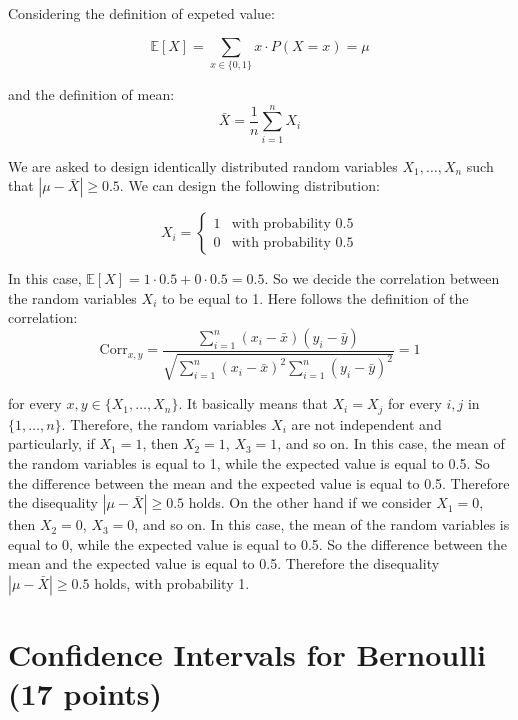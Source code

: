 \documentclass[a4paper,12pt]{article}
\begin{document}
Considering the definition of expeted value:

\begin{equation}
	\mathbb{E}[X] = \sum_{x \in \{0, 1\}} x \cdot P(X = x) = \mu
\end{equation}

and the definition of mean:
\begin{equation}
	\bar{X} = \frac{1}{n} \sum_{i=1}^{n} X_i
\end{equation}

We are asked to design identically distributed random variables $X_1, \dots,
	X_n$ such that $|\mu - \bar{X}| \geq 0.5$. We can design the following
distribution:

\begin{equation}
	X_i = \begin{cases}
		1 & \text{with probability } 0.5 \\
		0 & \text{with probability } 0.5
	\end{cases}
\end{equation}

In this case, $\mathbb{E}[X] = 1 \cdot 0.5 + 0 \cdot 0.5 = 0.5$. So we decide
the correlation between the random variables $X_i$ to be equal to 1. Here
follows the definition of the correlation:
\begin{equation}
	\text{Corr}_{x,y} = \frac{\sum_{i=1}^n (x_i - \bar{x})(y_i - \bar{y})}
	{\sqrt{\sum_{i=1}^n (x_i - \bar{x})^2 \sum_{i=1}^n (y_i - \bar{y})^2}} = 1
\end{equation}

for every $x, y \in \{X_1, \dots, X_n\}$.
It basically means that $X_i = X_j$ for every $i, j$ in $\{1, \dots, n\}$.
Therefore, the random variables $X_i$ are not independent and particularly, if
$X_1 = 1$, then $X_2 = 1$, $X_3 = 1$, and so on. In this case, the mean of the
random variables is equal to 1, while the expected value is equal to 0.5. So
the difference between the mean and the expected value is equal to 0.5.
Therefore the disequality $|\mu - \bar{X}| \geq 0.5$ holds.
On the other hand if we consider $X_1 = 0$, then $X_2 = 0$, $X_3 = 0$, and so
on. In this case, the mean of the random variables is equal to 0, while the
expected value is equal to 0.5. So the difference between the mean and the
expected value is equal to 0.5. Therefore the disequality $|\mu - \bar{X}| \geq
	0.5$ holds, with probability 1.

\section{Confidence Intervals for Bernoulli (17 points)}
\end{document}
